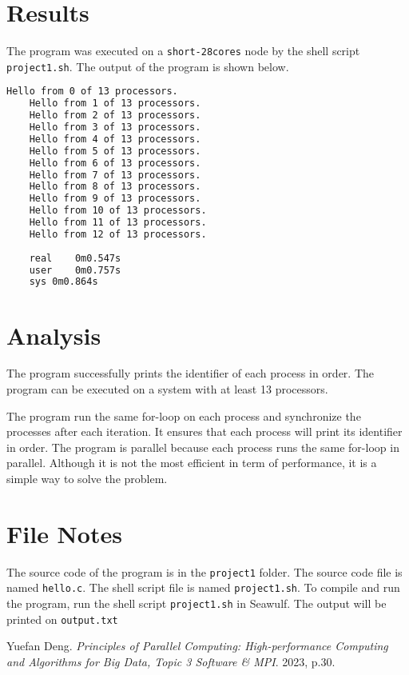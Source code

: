 \documentclass[12pt,a4paper]{article}
\begin{document}
\section{Results}
The program was executed on a \texttt{short-28cores} node by the shell script \texttt{project1.sh}. The output of the program is shown below.
\begin{lstlisting}[language=bash]
    Hello from 0 of 13 processors.
    Hello from 1 of 13 processors.
    Hello from 2 of 13 processors.
    Hello from 3 of 13 processors.
    Hello from 4 of 13 processors.
    Hello from 5 of 13 processors.
    Hello from 6 of 13 processors.
    Hello from 7 of 13 processors.
    Hello from 8 of 13 processors.
    Hello from 9 of 13 processors.
    Hello from 10 of 13 processors.
    Hello from 11 of 13 processors.
    Hello from 12 of 13 processors.
    
    real	0m0.547s
    user	0m0.757s
    sys	0m0.864s
\end{lstlisting}


\section{Analysis}
The program successfully prints the identifier of each process in order. 
The program can be executed on a system with at least 13 processors. 

The program run the same for-loop on each process and synchronize the processes after each iteration. 
It ensures that each process will print its identifier in order.
The program is parallel because each process runs the same for-loop in parallel.
Although it is not the most efficient in term of performance, it is a simple way to solve the problem.

\section*{File Notes}

The source code of the program is in the \texttt{project1} folder. The source code file is named \texttt{hello.c}. The shell script file is named \texttt{project1.sh}. To compile and run the program, run the shell script \texttt{project1.sh} in Seawulf. The output will be printed on \texttt{output.txt}

\begin{thebibliography}{1}

    Yuefan Deng.
    \textit{Principles of Parallel Computing: High-performance Computing and Algorithms for Big Data, Topic 3 Software \& MPI}.
    2023, p.30.
    
\end{thebibliography}
\end{document}
